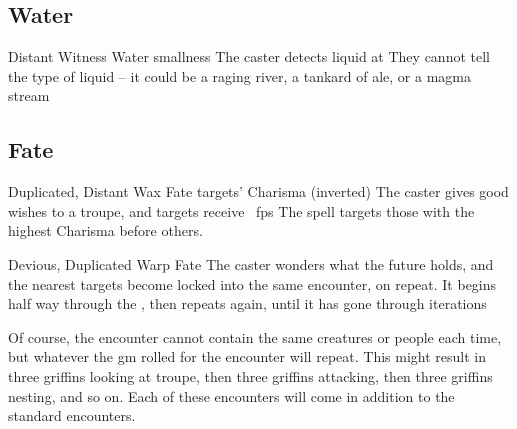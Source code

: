 \begin{multicols}{2}
{  
}{}

\subsection{Water}



  {Distant}%
  {Witness}%
  {Water}%
  {smallness}%
  {The caster detects liquid at \spellRange}%
  {They cannot tell the type of liquid -- it could be a raging river, a tankard of ale, or a magma stream}




\subsection{Fate}



  {Duplicated, Distant}%
  {Wax}%
  {Fate}%
  {targets' Charisma (inverted)}%
  {The caster gives good wishes to a troupe, and  targets receive \showDam~\glspl{fp}}%
  {The spell targets those with the highest Charisma before others.}


  {Devious, Duplicated}%
  {Warp}%
  {Fate}%
  {}%
  {The caster wonders what the future holds, and the nearest  targets become locked into the same encounter, on repeat.
  It begins half way through the \showOnset, then repeats again, until it has gone through  iterations}%
  {\par
  Of course, the encounter cannot contain the same creatures or people each time, but whatever the \gls{gm} rolled for the encounter will repeat.
  This might result in three griffins looking at troupe, then three griffins attacking, then three griffins nesting, and so on.
  Each of these encounters will come in addition to the standard encounters.}



\end{multicols}
